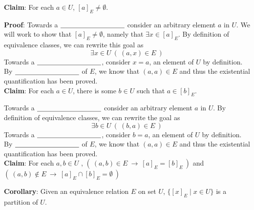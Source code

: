 
%
%
%

{\bf Claim}: For each  $a \in U$, $[a]_{E}  \neq  \emptyset$.

{\bf Proof}: Towards a $\underline{\phantom{\hspace{1.3in}}}$ 
consider an arbitrary element $a$ in $U$. 
We will work to show that $[a]_E \neq \emptyset$, namely that $\exists x \in [a]_E$.
By definition of equivalence classes, we can rewrite this goal as 
$$\exists x \in U ~( ~(a,x) \in E~)$$ 
Towards a $\underline{\phantom{\hspace{1.3in}}}$, consider $x = a$, 
an element of $U$ by definition. By $\underline{\phantom{\hspace{1.3in}}}$ of $E$, 
we know that $(a,a) \in E$  and thus the existential quantification has been proved.\\


{\bf Claim}: For each $a \in U$, there is some $b \in U$  such that $a \in [b]_{E}$.

Towards a $\underline{\phantom{\hspace{1.3in}}}$ 
consider an arbitrary element $a$ in $U$. By definition of equivalence classes, 
we can rewrite the goal as 
$$\exists b \in U ~( ~(b,a) \in E~)$$
Towards a $\underline{\phantom{\hspace{1.3in}}}$, consider $b = a$, 
an element of $U$ by definition. By $\underline{\phantom{\hspace{1.3in}}}$  of $E$, 
we know that $(a,a) \in E$  and thus the existential quantification has been proved. \\
 
{\bf Claim}: For each  $a,b  \in U$ , $(~(a,b)  \in  E ~\to ~ [a]_{E}  = [b]_{E}~)$
and  $(~(a,b)  \notin  E ~\to ~ [a]_{E} \cap[b]_{E} = \emptyset~)$

\phantom{Let $a,b$ be arbitrary. For first goal, assume towards
direct proof that $(a,b) \in E$. To show $[a]_E = [b]_E$ 
first consider arbitrary element $x$ in $[a]_E$. By definition
$(a,x) \in E$ so by symmetry, $(x,a) \in E$ and by 
transitivity with assumption, $(x,b)\in E$. Thus, by definition
of equivalence class, $x \in [b]_E$. Similarly, take arbitrary
element $y \in [b]_E$. By definition $(y,b) \in E$ 
and applying symmetry to assumption, we have $(b,a) \in E$
so by transitivity $(y,a) \in E$ and $y \in[a]_E$, as required
to complete the proof of set equality. For the second goal, 
assume (towards a proof by contrapositive) that $[a]_E \cap [b]_E 
\neq \emptyset$. Then there is a witness $w \in [a]_E \cap [b]_E$.
By definition of equivalence classes $(a,w) \in E$ and $(b,w) \in E$.
By symmetry, we have $(w,b) \in E$ so by transitivity $(a,b) \in E$,
as required.}

\vfill

{\bf Corollary}: Given an equivalence relation $E$ on set $U$,  
$\{ [x]_{E} \mid x \in U  \}$ is a partition of $U$.
\vfill